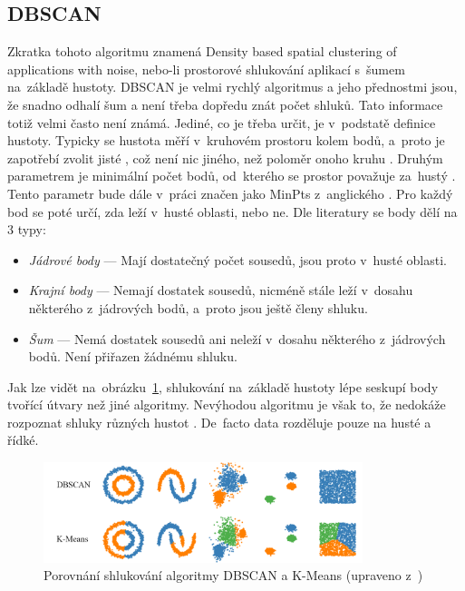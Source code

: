 \subsection{DBSCAN}
Zkratka tohoto algoritmu znamená Density based spatial clustering of applications with noise, nebo-li prostorové shlukování aplikací s~šumem na~základě hustoty. DBSCAN je velmi rychlý algoritmus a jeho přednostmi jsou, že snadno odhalí šum a není třeba dopředu znát počet shluků. Tato informace totiž velmi často není známá. Jediné, co je třeba určit, je v~podstatě definice hustoty. Typicky se hustota měří v~kruhovém prostoru kolem bodů, a~proto je zapotřebí zvolit jisté \textepsilon, což není nic jiného, než poloměr onoho kruhu \cite{data-science-concepts-and-practice}. Druhým parametrem je minimální počet bodů, od~kterého se prostor považuje za~hustý \cite{data-science-concepts-and-practice}. Tento parametr bude dále v~práci značen jako MinPts z~anglického . Pro každý bod se poté určí, zda leží v~husté oblasti, nebo ne. Dle literatury \cite{data-science-concepts-and-practice} se body dělí na 3 typy: 

\begin{itemize}
  \item \emph{Jádrové body} --- Mají dostatečný počet sousedů, jsou proto v~husté oblasti.
  \item \emph{Krajní body} --- Nemají dostatek sousedů, nicméně stále leží v~dosahu \textepsilon\space některého z~jádrových bodů, a~proto jsou ještě členy shluku.
  \item \emph{Šum} --- Nemá dostatek sousedů ani neleží v~dosahu \textepsilon\space některého z~jádrových bodů. Není přiřazen žádnému shluku.
\end{itemize}

Jak lze vidět na~obrázku~\ref{dbscan-vs-k-means-img}, shlukování na~základě hustoty lépe seskupí body tvořící útvary než jiné algoritmy. Nevýhodou algoritmu je však to, že nedokáže rozpoznat shluky různých hustot \cite{data-science-concepts-and-practice}. De~facto data rozděluje pouze na husté a řídké.

\begin{figure}[hbt]
	\centering
	\includegraphics[width=0.83\textwidth]{obrazky/dbscan-vs-k-means.pdf}
	\caption{Porovnání shlukování algoritmy DBSCAN a K-Means (upraveno z~\cite{dbscan-vs-k-means})}
	\label{dbscan-vs-k-means-img}
\end{figure}

